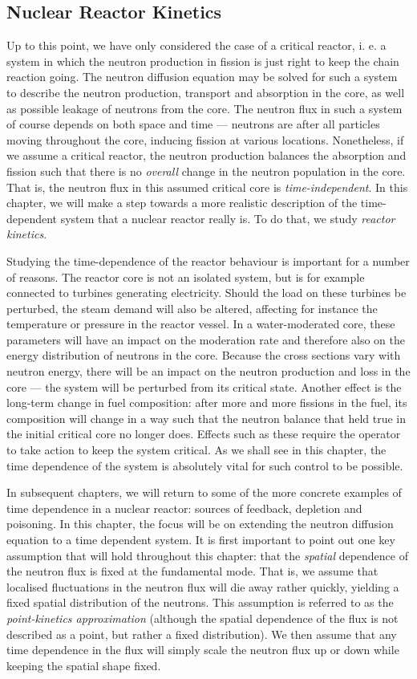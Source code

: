 \subsection{Nuclear Reactor Kinetics}
Up to this point, we have only considered the case of a critical reactor, i. e. a system in which the neutron production in fission is just right to keep the chain reaction going. The neutron diffusion equation may be solved for such a system to describe the neutron production, transport and absorption in the core, as well as possible leakage of neutrons from the core. The neutron flux in such a system of course depends on both space and time --- neutrons are after all particles moving throughout the core, inducing fission at various locations. Nonetheless, if we assume a critical reactor, the neutron production balances the absorption and fission such that there is no \emph{overall} change in the neutron population in the core. That is, the neutron flux in this assumed critical core is \emph{time-independent}. In this chapter, we will make a step towards a more realistic description of the time-dependent system that a nuclear reactor really is. To do that, we study \emph{reactor kinetics}.

Studying the time-dependence of the reactor behaviour is important for a number of reasons. The reactor core is not an isolated system, but is for example connected to turbines generating electricity. Should the load on these turbines be perturbed, the steam demand will also be altered, affecting for instance the temperature or pressure in the reactor vessel. In a water-moderated core, these parameters will have an impact on the moderation rate and therefore also on the energy distribution of neutrons in the core. Because the cross sections vary with neutron energy, there will be an impact on the neutron production and loss in the core --- the system will be perturbed from its critical state. Another effect is the long-term change in fuel composition: after more and more fissions in the fuel, its composition will change in a way such that the neutron balance that held true in the initial critical core no longer does. Effects such as these require the operator to take action to keep the system critical. As we shall see in this chapter, the time dependence of the system is absolutely vital for such control to be possible.

In subsequent chapters, we will return to some of the more concrete examples of time dependence in a nuclear reactor: sources of feedback, depletion and poisoning. In this chapter, the focus will be on extending the neutron diffusion equation to a time dependent system. It is first important to point out one key assumption that will hold throughout this chapter: that the \emph{spatial} dependence of the neutron flux is fixed at the fundamental mode. That is, we assume that localised fluctuations in the neutron flux will die away rather quickly, yielding a fixed spatial distribution of the neutrons. This assumption is referred to as the \emph{point-kinetics approximation} (although the spatial dependence of the flux is not described as a point, but rather a fixed distribution). We then assume that any time dependence in the flux will simply scale the neutron flux up or down while keeping the spatial shape fixed.

